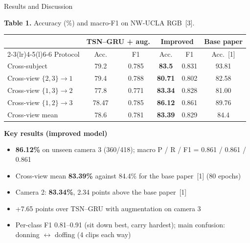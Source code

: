\documentclass{article}
\newcommand\smalltext{\fontsize{15}{18.5}\selectfont}
\begin{document}
\begin{psec}{Results and Discussion}
\begin{minipage}[t]{0.58\linewidth}
\vspace{0pt}\centering
{\smalltext\textbf{Table 1.} Accuracy (\%) and macro-F1 on NW-UCLA RGB~[3].}\\[2mm]
{\fontsize{16}{20.5}\selectfont
\renewcommand{\arraystretch}{1.15}
\begin{tabular}{@{}l cc cc c@{}}
\toprule
 & \multicolumn{2}{c}{TSN--GRU + aug.} & \multicolumn{2}{c}{\textbf{Improved}} & Base paper\\
 \cmidrule(lr){2-3}\cmidrule(lr){4-5}\cmidrule(l){6-6}
Protocol & Acc. & F1 & Acc. & F1 & Acc.~[1]\\\midrule
Cross-subject & 79.2 & 0.785 & \textbf{83.5} & 0.831 & 93.81\\
Cross-view $\{2,3\}\to1$ & 79.4 & 0.788 & \textbf{80.71} & 0.802 & 82.58\\
Cross-view $\{1,3\}\to2$ & 77.8 & 0.771 & \textbf{83.34} & 0.828 & 81.00\\
Cross-view $\{1,2\}\to3$ & 78.47 & 0.785 & \textbf{86.12} & 0.861 & 89.76\\
Cross-view mean & 78.6 & 0.781 & \textbf{83.39} & 0.829 & 84.4\\\bottomrule
\end{tabular}}
\end{minipage}\hfill
\begin{minipage}[t]{0.39\linewidth}
\vspace{0pt}
\begin{tcolorbox}[colback=white,colframe=accent,boxrule=1.3pt,arc=2mm,left=5mm,right=4mm,top=3mm,bottom=3mm,fontupper=\fontsize{16}{20}\selectfont]
\textbf{\color{navy}Key results (improved model)}
\begin{itemize}
\item \textbf{86.12\%} on unseen camera 3 (360/418); macro P / R / F1 = 0.861 / 0.861 / 0.861
\item Cross-view mean \textbf{83.39\%} against 84.4\% for the base paper~[1] (80 epochs)
\item Camera 2: \textbf{83.34\%}, 2.34 points above the base paper~[1]
\item +7.65 points over TSN--GRU with augmentation on camera 3
\item Per-class F1 0.81--0.91 (sit down best, carry hardest); main confusion: donning $\leftrightarrow$ doffing (4 clips each way)
\end{itemize}
\end{tcolorbox}
\end{minipage}


\end{psec}
\end{document}
